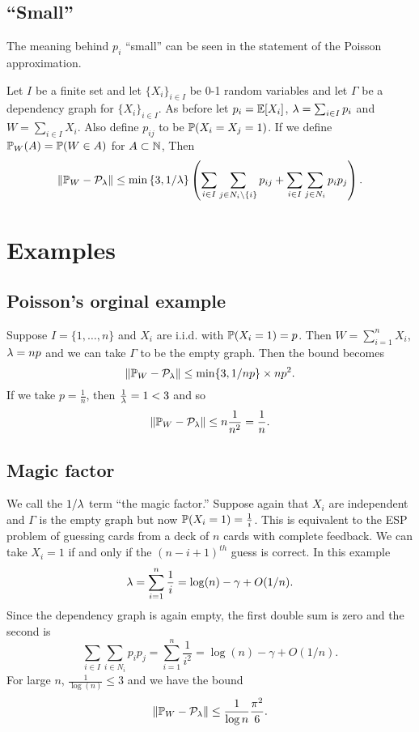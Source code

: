 \subsection{``Small''}
The meaning behind $p_i$ ``small'' can be seen in the statement of the Poisson approximation.
\begin{thrm}
    Let $I$ be a finite set and let $\{X_i\}_{i\in I}$ be 0-1 random variables and let $\Gamma$ be a dependency graph for $\{X_i\}_{i \in I}$. As before let $p_i = {\mathbb{E}}[X_i]$, $\lambda = \sum_{i \in I} p_i$ and $W = \sum_{i \in I}X_i$. Also define $p_{ij}$ to be ${\mathbb{P}}(X_i=X_j=1)$. If we define ${\mathbb{P}}_W(A) = {\mathbb{P}}(W \in A)$ for $A \subset {{\mathbb N}}$, Then 
    \[\left\|{\mathbb{P}}_W-{\mathcal{P}}_\lambda\right\| \le \min\left\{3, 1/\lambda\right\}\left(\sum_{i \in I}\sum_{j \in N_i \setminus \{i\}} p_{ij}+\sum_{i\in I}\sum_{j \in N_i}p_ip_j\right).\]
\end{thrm}
\section{Examples}
\subsection{Poisson's orginal example}
Suppose $I = \{1,\ldots,n\}$ and $X_i$ are i.i.d. with ${\mathbb{P}}(X_i=1)=p$. Then $W = \sum_{i=1}^n X_i$, $\lambda = np$ and we can take $\Gamma$ to be the empty graph. Then the bound becomes 
\[\left\|{\mathbb{P}}_W-{\mathcal{P}}_\lambda\right\| \le \min\{3,1/np\} \times np^2. \]
If we take $p = \frac{1}{n}$, then $\frac{1}{\lambda}=1<3$ and so 
\[\left\|{\mathbb{P}}_W - {\mathcal{P}}_\lambda\right\| \le n\frac{1}{n^2}=\frac{1}{n}. \]
\subsection{Magic factor}
We call the $1/\lambda$ term ``the magic factor.'' Suppose again that $X_i$ are independent and $\Gamma$ is the empty graph but now ${\mathbb{P}}(X_i=1)=\frac{1}{i}$. This is equivalent to the ESP problem of guessing cards from a deck of $n$ cards with complete feedback. We can take $X_i = 1$ if and only if the $(n-i+1)^{th}$ guess is correct. In this example
\[\lambda = \sum_{i=1}^n \frac{1}{i} = \log(n)-\gamma + O(1/n). \]
Since the dependency graph is again empty, the first double sum is zero and the second is
\[\sum_{i\in I}\sum_{i \in N_i} p_ip_j = \sum_{i=1}^n \frac{1}{i^2} = \log(n)-\gamma + O(1/n). \]
For large $n$, $\frac{1}{\log(n)} \le 3$ and we have the bound 
\[\left\|{\mathbb{P}}_W - {\mathcal{P}}_\lambda\right\| \le \frac{1}{\log n}\frac{\pi^2}{6}. \]

